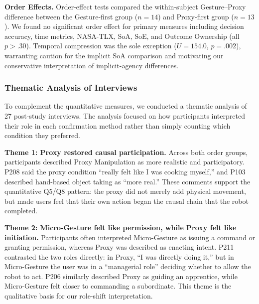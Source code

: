 \documentclass[sigconf,review,anonymous]{acmart}
\begin{document}
\textbf{Order Effects.}
Order-effect tests compared the within-subject Gesture--Proxy difference between the Gesture-first group ($n=14$) and Proxy-first group ($n=13$). We found no significant order effect for primary measures including decision accuracy, time metrics, NASA-TLX, SoA, SoE, and Outcome Ownership (all $p>.30$). Temporal compression was the sole exception ($U=154.0$, $p=.002$), warranting caution for the implicit SoA comparison and motivating our conservative interpretation of implicit-agency differences.

\subsubsection{Thematic Analysis of Interviews}

To complement the quantitative measures, we conducted a thematic analysis of 27 post-study interviews. The analysis focused on how participants interpreted their role in each confirmation method rather than simply counting which condition they preferred.

\textbf{Theme 1: Proxy restored causal participation.}
Across both order groups, participants described Proxy Manipulation as more realistic and participatory. P208 said the proxy condition ``really felt like I was cooking myself,'' and P103 described hand-based object taking as ``more real.'' These comments support the quantitative Q5/Q8 pattern: the proxy did not merely add physical movement, but made users feel that their own action began the causal chain that the robot completed.

\textbf{Theme 2: Micro-Gesture felt like permission, while Proxy felt like initiation.}
Participants often interpreted Micro-Gesture as issuing a command or granting permission, whereas Proxy was described as enacting intent. P211 contrasted the two roles directly: in Proxy, ``I was directly doing it,'' but in Micro-Gesture the user was in a ``managerial role'' deciding whether to allow the robot to act. P206 similarly described Proxy as guiding an apprentice, while Micro-Gesture felt closer to commanding a subordinate. This theme is the qualitative basis for our role-shift interpretation.
\end{document}
